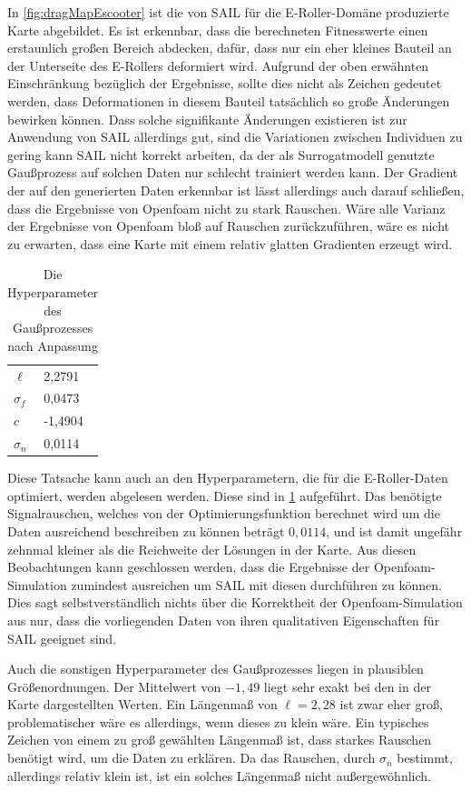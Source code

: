In \cref{fig:dragMapEscooter} ist die von SAIL für die E-Roller-Domäne produzierte Karte abgebildet.
Es ist erkennbar, dass die berechneten Fitnesswerte einen erstaunlich großen Bereich abdecken, dafür, dass nur ein eher kleines Bauteil an der Unterseite des E-Rollers deformiert wird.
Aufgrund der oben erwähnten Einschränkung bezüglich der Ergebnisse, sollte dies nicht als Zeichen gedeutet werden, dass Deformationen in diesem Bauteil tatsächlich so große Änderungen bewirken können.
Dass solche signifikante Änderungen existieren ist zur Anwendung von SAIL allerdings gut, sind die Variationen zwischen Individuen zu gering kann SAIL nicht korrekt arbeiten, da der als Surrogatmodell genutzte Gaußprozess auf solchen Daten nur schlecht trainiert werden kann.
Der Gradient der auf den generierten Daten erkennbar ist lässt allerdings auch darauf schließen, dass die Ergebnisse von Openfoam nicht zu stark Rauschen.
Wäre alle Varianz der Ergebnisse von Openfoam bloß auf Rauschen zurückzuführen, wäre es nicht zu erwarten, dass eine Karte mit einem relativ glatten Gradienten erzeugt wird.
\begin{table}[h]
	\centering
	\begin{tabularx}{.25\textwidth}{ll}\hline
		$\ell$ & 2,2791 \\
		$\sigma_f$ & 0,0473 \\
		$c$ & -1,4904 \\
		$\sigma_n$ & 0,0114 \\
	\end{tabularx}
	\label{tab:hyperparamsEscooter}
	\caption{Die Hyperparameter des Gaußprozesses nach Anpassung}
\end{table}
Diese Tatsache kann auch an den Hyperparametern, die für die E-Roller-Daten optimiert, werden abgelesen werden.
Diese sind in \cref{tab:hyperparamsEscooter} aufgeführt.
Das benötigte Signalrauschen, welches von der Optimierungsfunktion berechnet wird um die Daten ausreichend beschreiben zu können beträgt $0,0114$, und ist damit ungefähr zehnmal kleiner als die Reichweite der Lösungen in der Karte.
Aus diesen Beobachtungen kann geschlossen werden, dass die Ergebnisse der Openfoam-Simulation zumindest ausreichen um SAIL mit diesen durchführen zu können.
Dies sagt selbstverständlich nichts über die Korrektheit der Openfoam-Simulation aus nur, dass die vorliegenden Daten von ihren qualitativen Eigenschaften für SAIL geeignet sind.

Auch die sonstigen Hyperparameter des Gaußprozesses liegen in plausiblen Größenordnungen.
Der Mittelwert von $-1,49$ liegt sehr exakt bei den in der Karte dargestellten Werten.
Ein Längenmaß von $\ell=2,28$ ist zwar eher groß, problematischer wäre es allerdings, wenn dieses zu klein wäre.
Ein typisches Zeichen von einem zu groß gewählten Längenmaß ist, dass starkes Rauschen benötigt wird, um die Daten zu erklären.
Da das Rauschen, durch $\sigma_n$ bestimmt, allerdings relativ klein ist, ist ein solches Längenmaß nicht außergewöhnlich.

